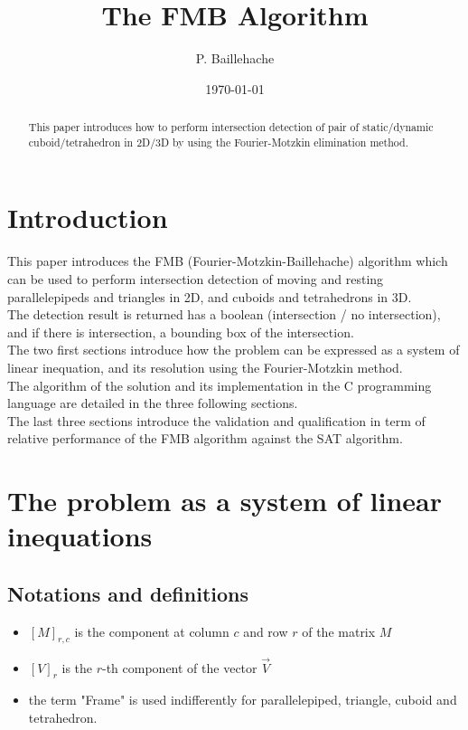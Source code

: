 \documentclass[12pt, a4paper]{article}
\begin{document}
\title{The FMB Algorithm}
\author{P. Baillehache}
\date{\today}
\maketitle

\begin{abstract}
This paper introduces how to perform intersection detection of pair of static/dynamic cuboid/tetrahedron in 2D/3D by using the Fourier-Motzkin elimination method.
\end{abstract}

\newpage
\tableofcontents

\section*{Introduction}

This paper introduces the FMB (Fourier-Motzkin-Baillehache) algorithm which can be used to perform intersection detection of moving and resting parallelepipeds and triangles in 2D, and cuboids and tetrahedrons in 3D.\\

The detection result is returned has a boolean (intersection / no intersection), and if there is intersection, a bounding box of the intersection.\\

The two first sections introduce how the problem can be expressed as a system of linear inequation, and its resolution using the Fourier-Motzkin method.\\

The algorithm of the solution and its implementation in the C programming language are detailed in the three following sections.\\

The last three sections introduce the validation and qualification in term of relative performance of the FMB algorithm against the SAT algorithm.
 
\section{The problem as a system of linear inequations}

\subsection{Notations and definitions}

\begin{itemize}
\item{$\left[M\right]_{r,c}$ is the component at column $c$ and row $r$ of the matrix $M$}
\item{$\left[V\right]_r$ is the $r$-th component of the vector $\overrightarrow{V}$}
\item the term "Frame" is used indifferently for parallelepiped, triangle, cuboid and tetrahedron.
\end{itemize}
\end{document}
